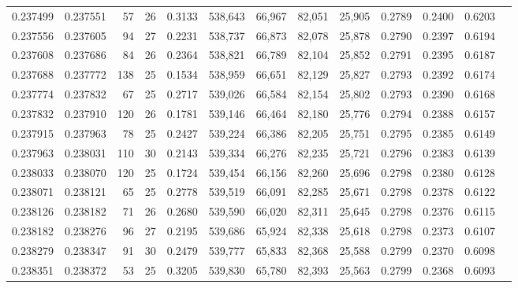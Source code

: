 \begin{tabular}{rrrrrrrrrrrrr}
0.237499 & 0.237551 &  57 &  26 &                                     0.3133 & 538,643 &  66,967 &  82,051 &  25,905 & 0.2789 & 0.2400 & 0.6203 \\
0.237556 & 0.237605 &  94 &  27 &                                     0.2231 & 538,737 &  66,873 &  82,078 &  25,878 & 0.2790 & 0.2397 & 0.6194 \\
0.237608 & 0.237686 &  84 &  26 &                                     0.2364 & 538,821 &  66,789 &  82,104 &  25,852 & 0.2791 & 0.2395 & 0.6187 \\
0.237688 & 0.237772 & 138 &  25 &                                     0.1534 & 538,959 &  66,651 &  82,129 &  25,827 & 0.2793 & 0.2392 & 0.6174 \\
0.237774 & 0.237832 &  67 &  25 &                                     0.2717 & 539,026 &  66,584 &  82,154 &  25,802 & 0.2793 & 0.2390 & 0.6168 \\
0.237832 & 0.237910 & 120 &  26 &                                     0.1781 & 539,146 &  66,464 &  82,180 &  25,776 & 0.2794 & 0.2388 & 0.6157 \\
0.237915 & 0.237963 &  78 &  25 &                                     0.2427 & 539,224 &  66,386 &  82,205 &  25,751 & 0.2795 & 0.2385 & 0.6149 \\
0.237963 & 0.238031 & 110 &  30 &                                     0.2143 & 539,334 &  66,276 &  82,235 &  25,721 & 0.2796 & 0.2383 & 0.6139 \\
0.238033 & 0.238070 & 120 &  25 &                                     0.1724 & 539,454 &  66,156 &  82,260 &  25,696 & 0.2798 & 0.2380 & 0.6128 \\
0.238071 & 0.238121 &  65 &  25 &                                     0.2778 & 539,519 &  66,091 &  82,285 &  25,671 & 0.2798 & 0.2378 & 0.6122 \\
0.238126 & 0.238182 &  71 &  26 &                                     0.2680 & 539,590 &  66,020 &  82,311 &  25,645 & 0.2798 & 0.2376 & 0.6115 \\
0.238182 & 0.238276 &  96 &  27 &                                     0.2195 & 539,686 &  65,924 &  82,338 &  25,618 & 0.2798 & 0.2373 & 0.6107 \\
0.238279 & 0.238347 &  91 &  30 &                                     0.2479 & 539,777 &  65,833 &  82,368 &  25,588 & 0.2799 & 0.2370 & 0.6098 \\
0.238351 & 0.238372 &  53 &  25 &                                     0.3205 & 539,830 &  65,780 &  82,393 &  25,563 & 0.2799 & 0.2368 & 0.6093 \\

\end{tabular}
